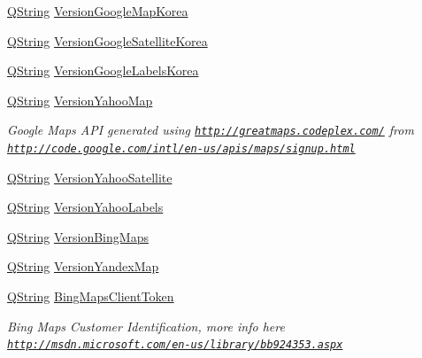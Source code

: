 \begin{DoxyCompactItemize}
\hyperlink{group___u_a_v_objects_plugin_gab9d252f49c333c94a72f97ce3105a32d}{Q\-String} \hyperlink{group___o_p_map_widget_ga3487c2fed1d7acaa4c9d34e8b4afd9de}{Version\-Google\-Map\-Korea}
\item 
\hyperlink{group___u_a_v_objects_plugin_gab9d252f49c333c94a72f97ce3105a32d}{Q\-String} \hyperlink{group___o_p_map_widget_ga33344ab29672c4dcedd40642df473969}{Version\-Google\-Satellite\-Korea}
\item 
\hyperlink{group___u_a_v_objects_plugin_gab9d252f49c333c94a72f97ce3105a32d}{Q\-String} \hyperlink{group___o_p_map_widget_ga4f4a5781537c7ee429695a130c8ccbdb}{Version\-Google\-Labels\-Korea}
\item 
\hyperlink{group___u_a_v_objects_plugin_gab9d252f49c333c94a72f97ce3105a32d}{Q\-String} \hyperlink{group___o_p_map_widget_ga3846cf6d2412f72a3c10be8d4066f7fc}{Version\-Yahoo\-Map}
\begin{DoxyCompactList}\small\item\em Google Maps A\-P\-I generated using \href{http://greatmaps.codeplex.com/}{\tt http\-://greatmaps.\-codeplex.\-com/} from \href{http://code.google.com/intl/en-us/apis/maps/signup.html}{\tt http\-://code.\-google.\-com/intl/en-\/us/apis/maps/signup.\-html} \end{DoxyCompactList}\item 
\hyperlink{group___u_a_v_objects_plugin_gab9d252f49c333c94a72f97ce3105a32d}{Q\-String} \hyperlink{group___o_p_map_widget_ga41e9afc6aa6f634642d2aaa246c1a60e}{Version\-Yahoo\-Satellite}
\item 
\hyperlink{group___u_a_v_objects_plugin_gab9d252f49c333c94a72f97ce3105a32d}{Q\-String} \hyperlink{group___o_p_map_widget_gae16013eddeb9d3b70af56f0e03eeab19}{Version\-Yahoo\-Labels}
\item 
\hyperlink{group___u_a_v_objects_plugin_gab9d252f49c333c94a72f97ce3105a32d}{Q\-String} \hyperlink{group___o_p_map_widget_ga98d1eeb119258d3fb9fab1a550604eb0}{Version\-Bing\-Maps}
\item 
\hyperlink{group___u_a_v_objects_plugin_gab9d252f49c333c94a72f97ce3105a32d}{Q\-String} \hyperlink{group___o_p_map_widget_ga4e8dc0424dc67c6a4248f5bb6a770403}{Version\-Yandex\-Map}
\item 
\hyperlink{group___u_a_v_objects_plugin_gab9d252f49c333c94a72f97ce3105a32d}{Q\-String} \hyperlink{group___o_p_map_widget_ga4c3a944c12deba7b13251f0c04685ac6}{Bing\-Maps\-Client\-Token}
\begin{DoxyCompactList}\small\item\em Bing Maps Customer Identification, more info here \href{http://msdn.microsoft.com/en-us/library/bb924353.aspx}{\tt http\-://msdn.\-microsoft.\-com/en-\/us/library/bb924353.\-aspx} \end{DoxyCompactList}\end{DoxyCompactItemize}
